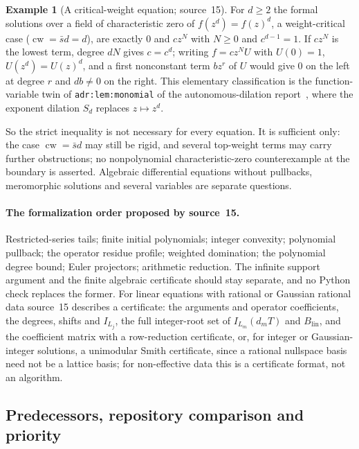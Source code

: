 \documentclass[11pt]{article}
\numberwithin{equation}{section}
\theoremstyle{definition}
\newtheorem{example}[theorem]{Example}
\theoremstyle{remark}
\begin{document}
\begin{example}[A critical-weight equation; source~15]\label{hol:pc:ex:critical}
For $d\ge2$ the formal solutions over a field of characteristic zero of
$f(z^d)=f(z)^d$, a weight-critical case ($\operatorname{cw}=\bar sd=d$), are
exactly $0$ and $cz^N$ with $N\ge0$ and $c^{d-1}=1$. If $cz^N$ is the lowest
term, degree $dN$ gives $c=c^d$; writing $f=cz^NU$ with $U(0)=1$, $U(z^d)=U(z)^d$,
and a first nonconstant term $bz^r$ of $U$ would give $0$ on the left at degree
$r$ and $db\ne0$ on the right. This elementary classification is the
function-variable twin of \texttt{adr:lem:monomial} of the autonomous-dilation
report~\cite{repoadr}, where the exponent dilation $S_d$ replaces $z\mapsto
z^d$.
\end{example}

So the strict inequality is not necessary for every equation. It is
sufficient only: the case $\operatorname{cw}=\bar sd$ may still be rigid, and
several top-weight terms may carry further obstructions; no nonpolynomial
characteristic-zero counterexample at the boundary is asserted. Algebraic
differential equations without pullbacks, meromorphic solutions and several
variables are separate questions.

\paragraph{The formalization order proposed by source~15.}
Restricted-series tails; finite initial polynomials; integer convexity;
polynomial pullback; the operator residue profile; weighted domination; the
polynomial degree bound; Euler projectors; arithmetic reduction. The infinite
support argument and the finite algebraic certificate should stay separate,
and no Python check replaces the former. For linear equations with rational
or Gaussian rational data source~15 describes a certificate: the arguments and
operator coefficients, the degrees, shifts and $I_{L_j}$, the full integer-root
set of $I_{L_m}(d_mT)$ and $B_{\mathrm{lin}}$, and the coefficient matrix with a
row-reduction certificate, or, for integer or Gaussian-integer solutions, a
unimodular Smith certificate, since a rational nullspace basis need not be a
lattice basis; for non-effective data this is a certificate format, not an
algorithm.

\subsection{Predecessors, repository comparison and priority}
\label{hol:pc:sub:predecessors}
\end{document}

